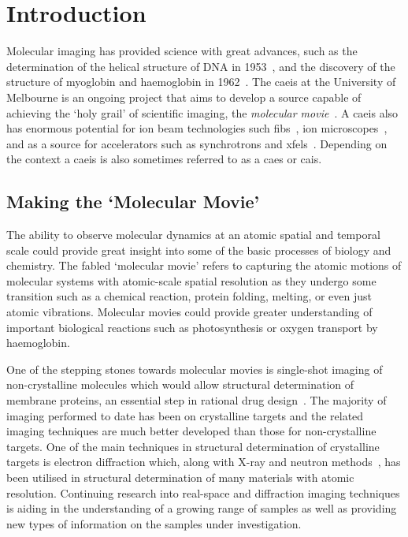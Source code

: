 \chapter{Introduction}
 
\setcounter{page}{1}

Molecular imaging has provided science with great advances, such as the determination of the helical structure of DNA in 1953~\cite{watson_molecular_1953}, and the discovery of the structure of myoglobin and haemoglobin in 1962~\cite{kendrew_x-ray_1957}.
The \gls{caeis} at the University of Melbourne is an ongoing project that aims to develop a source capable of achieving the `holy grail' of scientific imaging, the \emph{molecular movie}~\cite{dwyer_femtosecond_2006,sciaini_femtosecond_2011}.
A \gls{caeis} also has enormous potential for ion beam technologies such \glspl{fib}~\cite{mcclelland_bright_2016}, ion microscopes~\cite{knuffman_cold_2013}, and as a source for accelerators such as synchrotrons and \glspl{xfel}~\cite{van_oudheusden_electron_2007,zhu_future_2015,mcculloch_cold_2016}.
Depending on the context a \gls{caeis} is also sometimes referred to as a \gls{caes} or \gls{cais}.

\section{Making the `Molecular Movie'}

The ability to observe molecular dynamics at an atomic spatial and temporal scale could provide great insight into some of the basic processes of biology and chemistry.
The fabled `molecular movie' refers to capturing the atomic motions of molecular systems with atomic-scale spatial resolution as they undergo some transition such as a chemical reaction, protein folding, melting, or even just atomic vibrations.
Molecular movies could provide greater understanding of important biological reactions such as photosynthesis or oxygen transport by haemoglobin.

One of the stepping stones towards molecular movies is single-shot imaging of non-crystalline molecules which would allow structural determination of membrane proteins, an essential step in rational drug design~\cite{hardy_atomic_1987, barrett_discovering_1999, pinto_influenza_1992}.
The majority of imaging performed to date has been on crystalline targets and the related imaging techniques are much better developed than those for non-crystalline targets.
One of the main techniques in structural determination of crystalline targets is electron diffraction which, along with X-ray and neutron methods~\cite{cullity_elements_2001,bacon_x-ray_2013}, has been utilised in structural determination of many materials with atomic resolution.
Continuing research into real-space and diffraction imaging techniques is aiding in the understanding of a growing range of samples as well as providing new types of information on the samples under investigation.

